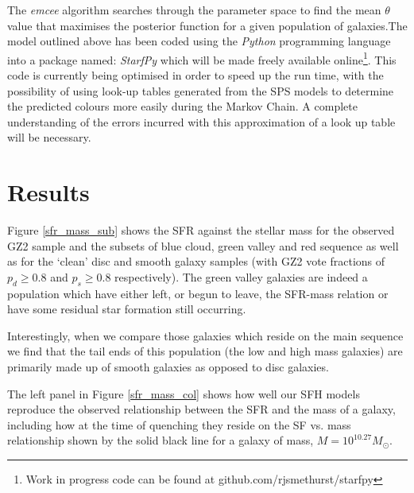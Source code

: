 \documentclass{mn2e}
\begin{document}
The \emph{emcee} algorithm searches through the parameter space to find the mean $\theta$ value that maximises the posterior function for a given population of galaxies.The model outlined above has been coded using the \emph{Python} programming language into a package named: \emph{StarfPy} which will be made freely available online\footnote{Work in progress code can be found at github.com/rjsmethurst/starfpy}. This code is currently being optimised in order to speed up the run time, with the possibility of using look-up tables generated from the SPS models to determine the predicted colours more easily during the Markov Chain. A complete understanding of the errors incurred with this approximation of a look up table will be necessary. 

\section{Results}\label{results}


Figure \ref{sfr_mass_sub} shows the SFR against the stellar mass for the observed GZ2 sample and the subsets of blue cloud, green valley and red sequence as well as for the `clean' disc and smooth galaxy samples (with GZ2 vote fractions of $p_d \geq 0.8$ and $p_s \geq 0.8$ respectively). The green valley galaxies are indeed a population which have either left, or begun to leave, the SFR-mass relation or have some residual star formation still occurring. 

Interestingly, when we compare those galaxies which reside on the main sequence we find that the tail ends of this population (the low and high mass  galaxies) are primarily made up of smooth galaxies as opposed to disc galaxies.

The left panel in Figure \ref{sfr_mass_col} shows how well our SFH models reproduce the observed relationship between the SFR and the mass of a galaxy, including how at the time of quenching they reside on the SF vs. mass relationship shown by the solid black line for a galaxy of mass, $M = 10^{10.27} M_{\odot}$. 

%
\end{document}
